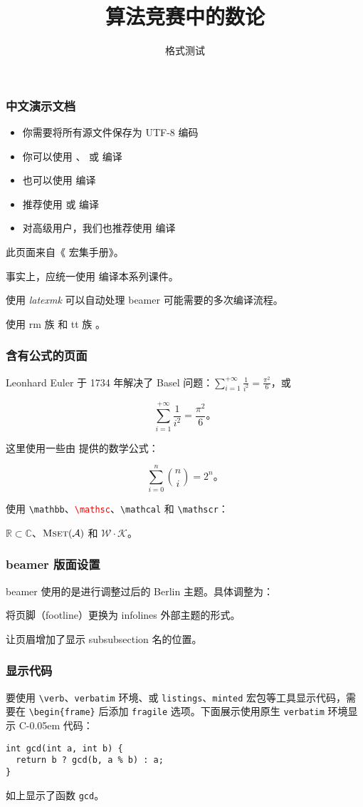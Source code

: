 \documentclass{../pkslide}
\title[算法竞赛中的数论（格式测试）]{算法竞赛中的数论}
\subtitle{格式测试}
\newcommand{\Cpp}{\texorpdfstring{C\kern-0.05em\protect\raisebox{.35ex}{\textsmaller[2]{+\kern-0.05em+}}}{C++}}
\begin{document}
\begin{frame}
  \frametitle{中文演示文档}
  \begin{itemize}
    \item 你需要将所有源文件保存为 UTF-8 编码
    \item 你可以使用 \XeLaTeX{}、\LuaLaTeX{} 或 \upLaTeX{} 编译
    \item 也可以使用 \pdfLaTeX{} 编译
    \item 推荐使用 \XeLaTeX{} 或 \LuaLaTeX{} 编译
    \item 对高级用户，我们也推荐使用 \upLaTeX{} 编译
  \end{itemize}
  
  此页面来自《\CTeX{} 宏集手册》。
  
  事实上，应统一使用 \XeLaTeX{} 编译本系列课件。
  
  使用 \emph{latexmk} 可以自动处理 {\sffamily beamer} 可能需要的多次编译流程。
  
  使用 rm 族 \textrm{\XeLaTeX} 和 tt 族 \texttt{\XeLaTeX}。
\end{frame}

\begin{frame}
  \frametitle{含有公式的页面}
  Leonhard Euler 于 1734 年解决了 Basel 问题：$\sum_{i = 1}^{+\infty} \frac{1}{i^2} = \frac{\pi^2}{6}$，或
  
  \[ \sum_{i = 1}^{+\infty} \frac{1}{i^2} = \frac{\pi^2}{6} \text{。} \]
  
  这里使用一些由 \AmSLaTeX{} 提供的数学公式：
  
  \[ \sum_{i = 0}^{n} \binom{n}{i} = 2^n \text{。} \]
  
  使用 \texttt{\textbackslash{}mathbb}、\textcolor{red}{\texttt{\textbackslash{}mathsc}}、\texttt{\textbackslash{}mathcal} 和 \texttt{\textbackslash{}mathscr}：
  
  $\mathbb{R} \subset \mathbb{C}$、${\text{\rmfamily{}\scshape{}Mset}}(\mathcal{A})$ 和 $\mathscr{W} \cdot \mathscr{K}$。
\end{frame}

\begin{frame}
  \frametitle{beamer 版面设置}
  beamer 使用的是进行调整过后的 Berlin 主题。具体调整为：
  
  将页脚（footline）更换为 infolines 外部主题的形式。
  
  让页眉增加了显示 subsubsection 名的位置。
\end{frame}

\begin{frame}[fragile]
  \frametitle{显示代码}
  要使用 \verb|\verb|、\verb|verbatim| 环境、或 \verb|listings|、\verb|minted| 宏包等工具显示代码，需要在 \verb|\begin{frame}| 后添加 \verb|fragile| 选项。下面展示使用原生 \verb|verbatim| 环境显示 \Cpp{} 代码：
  
\begin{verbatim}
int gcd(int a, int b) {
  return b ? gcd(b, a % b) : a;
}
\end{verbatim}
  
  如上显示了函数 \verb|gcd|。
\end{frame}
\end{document}
